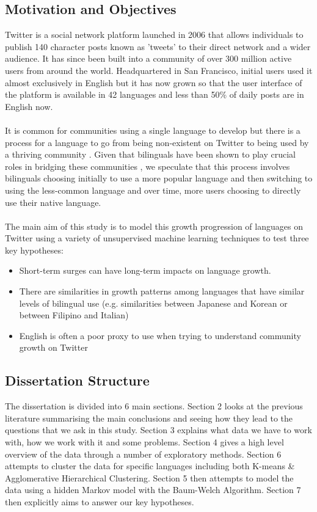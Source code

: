 \documentclass[12pt]{article}
\begin{document}
\subsection{Motivation and Objectives}
Twitter is a social network platform launched in 2006 that allows individuals to publish 140 character posts known as 'tweets' to their direct network and a wider audience. It has since been built into a community of over 300 million active users from around the world. Headquartered in San Francisco, initial users used it almost exclusively in English but it has now grown so that the user interface of the platform is available in 42 languages and less than 50\% \cite{Halemain} of daily posts are in English now.
\\\\
It is common for communities using a single language to develop \cite{Halemain} but there is a process for a language to go from being non-existent on Twitter to being used by a thriving community . Given that bilinguals have been shown to play crucial roles in bridging these communities \cite{Halemain}, we speculate that this process involves bilinguals choosing initially to use a more popular language and then switching to using the less-common language and over time, more  users choosing to directly use their native language.
\\\\
The main aim of this study is to model this growth progression of languages on Twitter using a variety of unsupervised machine learning techniques to test three key hypotheses:
\begin{itemize}
\item Short-term surges can have long-term impacts on language growth.
\item There are similarities in growth patterns among languages that have similar levels of bilingual use (e.g. similarities between Japanese and Korean or between Filipino and Italian)
\item English is often a poor proxy to use when trying to understand community growth on Twitter
\end{itemize}
\subsection{Dissertation Structure}
The dissertation is divided into 6 main sections. Section 2 looks at the previous literature summarising the main conclusions and seeing how they lead to the questions that we ask in this study. Section 3 explains what data we have to work with, how we work with it and some problems. Section 4 gives a high level overview of the data through a number of exploratory methods. Section 6 attempts to cluster the data for specific languages including both K-means \& Agglomerative Hierarchical Clustering. Section 5 then attempts to model the data using a hidden Markov model with the Baum-Welch Algorithm. Section 7 then explicitly aims to answer our key hypotheses.
\newpage
\end{document}
